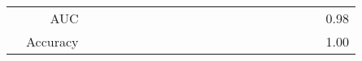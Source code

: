 \documentclass{article}
\providecommand{\tabularnewline}{\\}
\begin{document}
\begin{sidewaystable}
\begin{tabular}{|r|r|rrrrrr|r|r|r|r|r|r|r|r|r|r|r|r|r|}
 \cline{2-2} \cline{21-21}
 & AUC & \multicolumn{1}{r}{} & \multicolumn{1}{r}{} & \multicolumn{1}{r}{} & \multicolumn{1}{r}{} & \multicolumn{1}{r}{} & \multicolumn{1}{r}{} & \multicolumn{1}{r}{} & \multicolumn{1}{r}{} & \multicolumn{1}{r}{} & \multicolumn{1}{r}{} & \multicolumn{1}{r}{} & \multicolumn{1}{r}{} & \multicolumn{1}{r}{} & \multicolumn{1}{r}{} & \multicolumn{1}{r}{} & \multicolumn{1}{r}{} & \multicolumn{1}{r}{} & \multicolumn{1}{r|}{} & 0.98\tabularnewline
 \cline{2-2} \cline{21-21}
 & Accuracy & \multicolumn{1}{r}{} & \multicolumn{1}{r}{} & \multicolumn{1}{r}{} & \multicolumn{1}{r}{} & \multicolumn{1}{r}{} & \multicolumn{1}{r}{} & \multicolumn{1}{r}{} & \multicolumn{1}{r}{} & \multicolumn{1}{r}{} & \multicolumn{1}{r}{} & \multicolumn{1}{r}{} & \multicolumn{1}{r}{} & \multicolumn{1}{r}{} & \multicolumn{1}{r}{} & \multicolumn{1}{r}{} & \multicolumn{1}{r}{} & \multicolumn{1}{r}{} & \multicolumn{1}{r|}{} & 1.00\tabularnewline
 \cline{1-21}
\end{tabular}\label{tab:addlabel}
\end{sidewaystable}
\end{document}
